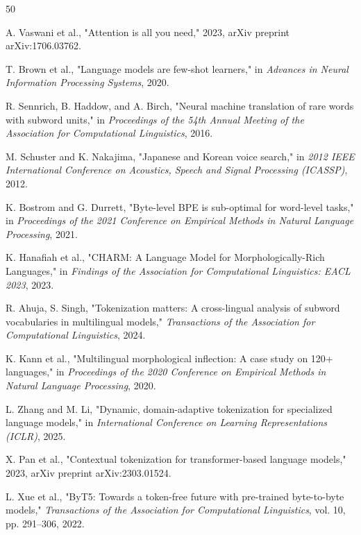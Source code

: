 \documentclass[conference]{IEEEtran}
\begin{document}
\begin{thebibliography}{50}

A. Vaswani et al., "Attention is all you need," 2023, arXiv preprint arXiv:1706.03762.

T. Brown et al., "Language models are few-shot learners," in \textit{Advances in Neural Information Processing Systems}, 2020.

R. Sennrich, B. Haddow, and A. Birch, "Neural machine translation of rare words with subword units," in \textit{Proceedings of the 54th Annual Meeting of the Association for Computational Linguistics}, 2016.

M. Schuster and K. Nakajima, "Japanese and Korean voice search," in \textit{2012 IEEE International Conference on Acoustics, Speech and Signal Processing (ICASSP)}, 2012.

K. Bostrom and G. Durrett, "Byte-level BPE is sub-optimal for word-level tasks," in \textit{Proceedings of the 2021 Conference on Empirical Methods in Natural Language Processing}, 2021.

K. Hanafiah et al., "CHARM: A Language Model for Morphologically-Rich Languages," in \textit{Findings of the Association for Computational Linguistics: EACL 2023}, 2023.

R. Ahuja, S. Singh, "Tokenization matters: A cross-lingual analysis of subword vocabularies in multilingual models," \textit{Transactions of the Association for Computational Linguistics}, 2024.

K. Kann et al., "Multilingual morphological inflection: A case study on 120+ languages," in \textit{Proceedings of the 2020 Conference on Empirical Methods in Natural Language Processing}, 2020.

L. Zhang and M. Li, "Dynamic, domain-adaptive tokenization for specialized language models," in \textit{International Conference on Learning Representations (ICLR)}, 2025.

X. Pan et al., "Contextual tokenization for transformer-based language models," 2023, arXiv preprint arXiv:2303.01524.

L. Xue et al., "ByT5: Towards a token-free future with pre-trained byte-to-byte models," \textit{Transactions of the Association for Computational Linguistics}, vol. 10, pp. 291–306, 2022.


\end{thebibliography}
\end{document}
